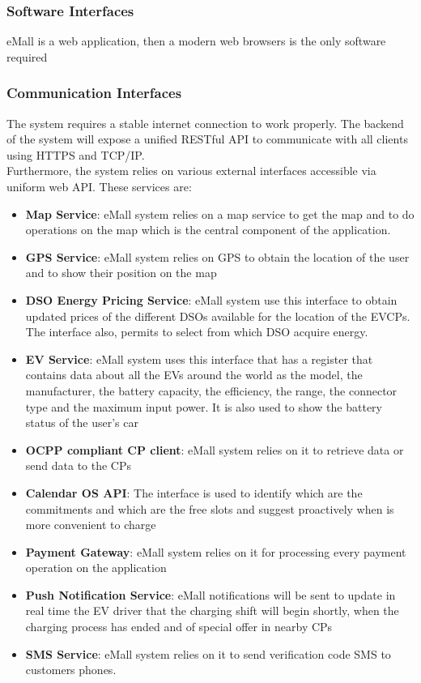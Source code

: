 \subsubsection{Software Interfaces}
eMall is a web application, then a modern web browsers is the only software required

\subsubsection{Communication Interfaces}
The system requires a stable internet connection to work properly.
The backend of the system will expose a unified RESTful API to communicate
with all clients using HTTPS and TCP/IP.
\\Furthermore, the system relies on various external interfaces accessible via uniform web API. These services are:
\begin{itemize}
    \item \textbf{Map Service}: eMall system relies on a map service to get the map and to do operations on the map which is the central component of the application.
    \item \textbf{GPS Service}: eMall system relies on GPS to obtain the location of the user and to show their position on the map
    \item \textbf{DSO Energy Pricing Service}: eMall system use this interface to obtain updated prices of the different DSOs available for the location of the EVCPs. The interface also, permits to select from which DSO acquire energy.
    \item \textbf{EV Service}: eMall system uses this interface that has a register that contains data about all the EVs around the world as the model, the manufacturer, the battery capacity, the efficiency, the range, the connector type and the maximum input power. It is also used to show the battery status of the user's car
    \item \textbf{OCPP compliant CP client}: eMall system relies on it to retrieve data or send data to the CPs
    \item \textbf{Calendar OS API}: The interface is used to identify which are the commitments and which are the free slots and suggest proactively when is more convenient to charge
    \item \textbf{Payment Gateway}: eMall system relies on it for processing every payment operation on the application
    \item \textbf{Push Notification Service}: eMall notifications will be sent to update in real time the EV driver that the charging shift will begin shortly, when the charging process has ended and of special offer in nearby CPs
    \item \textbf{SMS Service}: eMall system relies on it to send verification code SMS to customers phones.
\end{itemize}


